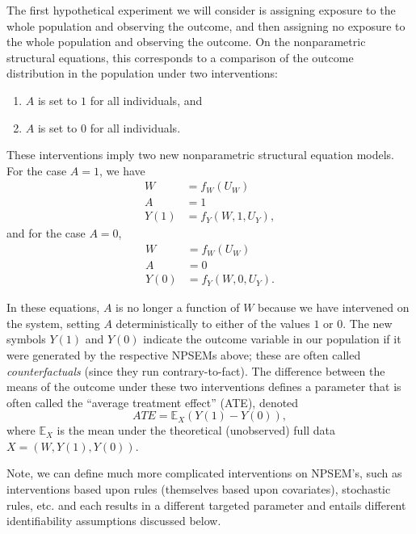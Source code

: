 \documentclass[12pt, krantz2,]{krantz}
\providecommand{\tightlist}{%
  \setlength{\itemsep}{0pt}\setlength{\parskip}{0pt}}
\theoremstyle{definition}
\theoremstyle{definition}
\theoremstyle{definition}
\newcommand{\E}{\mathbb{E}}
\newcommand{\1}{\mathbbm{1}}
\begin{document}
The first hypothetical experiment we will consider is assigning exposure to the
whole population and observing the outcome, and then assigning no exposure to
the whole population and observing the outcome. On the nonparametric structural
equations, this corresponds to a comparison of the outcome distribution in the
population under two interventions:

\begin{enumerate}
\def\labelenumi{\arabic{enumi}.}
\tightlist
\item
  \(A\) is set to \(1\) for all individuals, and
\item
  \(A\) is set to \(0\) for all individuals.
\end{enumerate}

These interventions imply two new nonparametric structural equation models. For
the case \(A = 1\), we have
\begin{align*}
  W &= f_W(U_W) \\
  A &= 1 \\
  Y(1) &= f_Y(W, 1, U_Y),
\end{align*}
and for the case \(A=0\),
\begin{align*}
  W &= f_W(U_W) \\
  A &= 0 \\
  Y(0) &= f_Y(W, 0, U_Y).
\end{align*}

In these equations, \(A\) is no longer a function of \(W\) because we have
intervened on the system, setting \(A\) deterministically to either of the values
\(1\) or \(0\). The new symbols \(Y(1)\) and \(Y(0)\) indicate the outcome variable in
our population if it were generated by the respective NPSEMs above; these are
often called \emph{counterfactuals} (since they run contrary-to-fact). The difference
between the means of the outcome under these two interventions defines a
parameter that is often called the ``average treatment effect'' (ATE), denoted
\begin{equation}
  ATE = \E_X(Y(1) - Y(0)),
  \label{eq:ate}
\end{equation}
where \(\E_X\) is the mean under the theoretical (unobserved) full data \(X = (W, Y(1), Y(0))\).

Note, we can define much more complicated interventions on NPSEM's, such as
interventions based upon rules (themselves based upon covariates), stochastic
rules, etc. and each results in a different targeted parameter and entails
different identifiability assumptions discussed below.
\end{document}
